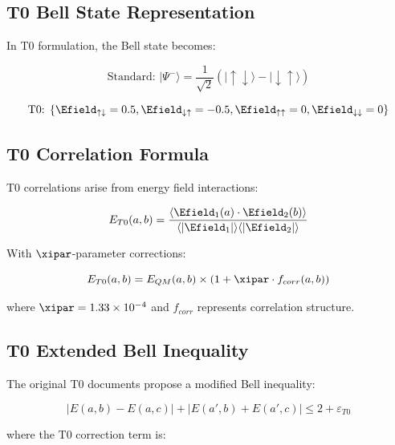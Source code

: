 	\subsection{T0 Bell State Representation}
	
	In T0 formulation, the Bell state becomes:
	
	\begin{equation}
		\text{Standard: } |\Psi^-\rangle = \frac{1}{\sqrt{2}}(|\uparrow\downarrow\rangle - |\downarrow\uparrow\rangle)
	\end{equation}
	
	\begin{equation}
		\text{T0: } \{\Efield_{\uparrow\downarrow} = 0.5, \Efield_{\downarrow\uparrow} = -0.5, \Efield_{\uparrow\uparrow} = 0, \Efield_{\downarrow\downarrow} = 0\}
	\end{equation}
	
	\subsection{T0 Correlation Formula}
	
	T0 correlations arise from energy field interactions:
	
	\begin{equation}
		E_{T0}(a,b) = \frac{\langle \Efield_1(a) \cdot \Efield_2(b) \rangle}{\langle |\Efield_1| \rangle \langle |\Efield_2| \rangle}
	\end{equation}
	
	With $\xipar$-parameter corrections:
	
	\begin{equation}
		E_{T0}(a,b) = E_{QM}(a,b) \times (1 + \xipar \cdot f_{corr}(a,b))
	\end{equation}
	
	where $\xipar = 1.33 \times 10^{-4}$ and $f_{corr}$ represents correlation structure.
	
	\subsection{T0 Extended Bell Inequality}
	
	The original T0 documents propose a modified Bell inequality:
	
	\begin{equation}
		|E(a,b) - E(a,c)| + |E(a',b) + E(a',c)| \leq 2 + \varepsilon_{T0}
	\end{equation}
	
	where the T0 correction term is:
	
